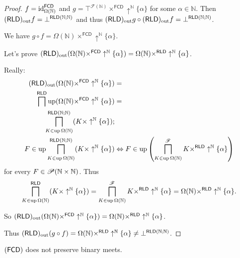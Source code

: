 \begin{proof}
$f=\operatorname{id}_{\Omega(\mathbb{N})}^{\mathsf{FCD}}$ and $g=\top^{\mathscr{F}(\mathbb{N})}\times^{\mathsf{FCD}}\uparrow^{\mathbb{N}}\{\alpha\}$
for some $\alpha\in\mathbb{N}$. Then $(\mathsf{RLD})_{\mathrm{out}} f=\bot^{\mathsf{RLD}(\mathbb{N};\mathbb{N})}$
and thus $(\mathsf{RLD})_{\mathrm{out}} g\circ(\mathsf{RLD})_{\mathrm{out}} f=\bot^{\mathsf{RLD}(\mathbb{N};\mathbb{N})}$.

We have $g\circ f=\Omega(\mathbb{N})\times^{\mathsf{FCD}}\uparrow^{\mathbb{N}}\{\alpha\}$.

Let's prove $(\mathsf{RLD})_{\mathrm{out}}(\Omega(\mathbb{N})\times^{\mathsf{FCD}}\uparrow^{\mathbb{N}}\{\alpha\})=\Omega(\mathbb{N})\times^{\mathsf{RLD}}\uparrow^{\mathbb{N}}\{\alpha\}$.

Really:
\begin{align*}
(\mathsf{RLD})_{\mathrm{out}}(\Omega(\mathbb{N})\times^{\mathsf{FCD}}\uparrow^{\mathbb{N}}\{\alpha\}) & =\\
\bigsqcap^{\mathsf{RLD}}\operatorname{up}(\Omega(\mathbb{N})\times^{\mathsf{FCD}}\uparrow^{\mathbb{N}}\{\alpha\}) & =\\
\bigsqcap_{K\in\operatorname{up}\Omega(\mathbb{N})}^{\mathsf{RLD}(\mathbb{N};\mathbb{N})}(K\times\uparrow^{\mathbb{N}}\{\alpha\});\\
F\in\operatorname{up}\bigsqcap_{K\in\operatorname{up}\Omega(\mathbb{N})}^{\mathsf{RLD}(\mathbb{N};\mathbb{N})}(K\times\uparrow^{\mathbb{N}}\{\alpha\}) & \Leftrightarrow F\in\operatorname{up}\left(\bigsqcap_{K\in\operatorname{up}\Omega(\mathbb{N})}^{\mathscr{F}}K\times^{\mathsf{RLD}}\uparrow^{\mathbb{N}}\{\alpha\}\right)
\end{align*}
for every $F\in\mathscr{P}(\mathbb{N}\times\mathbb{N})$. Thus 
\[
\bigsqcap_{K\in\operatorname{up}\Omega(\mathbb{N})}^{\mathsf{RLD}}(K\times\uparrow^{\mathbb{N}}\{\alpha\})=\bigsqcap_{K\in\operatorname{up}\Omega(\mathbb{N})}^{\mathscr{F}}K\times^{\mathsf{RLD}}\uparrow^{\mathbb{N}}\{\alpha\}=\Omega(\mathbb{N})\times^{\mathsf{RLD}}\uparrow^{\mathbb{N}}\{\alpha\}.
\]


So $(\mathsf{RLD})_{\mathrm{out}}(\Omega(\mathbb{N})\times^{\mathsf{FCD}}\uparrow^{\mathbb{N}}\{\alpha\})=\Omega(\mathbb{N})\times^{\mathsf{RLD}}\uparrow^{\mathbb{N}}\{\alpha\}$.

Thus $(\mathsf{RLD})_{\mathrm{out}}(g\circ f)=\Omega(\mathbb{N})\times^{\mathsf{RLD}}\uparrow^{\mathbb{N}}\{\alpha\}\ne\bot^{\mathsf{RLD}(\mathbb{N};\mathbb{N})}$.\end{proof}
\begin{example}
$(\mathsf{FCD})$ does not preserve binary meets.\end{example}
